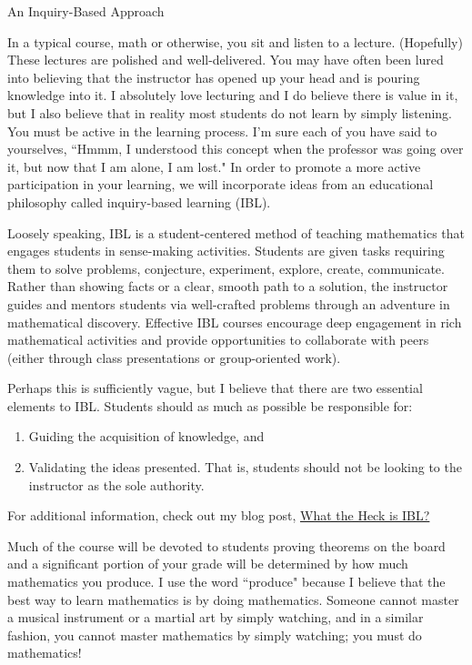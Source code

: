 \begin{section}{An Inquiry-Based Approach}

In a typical course, math or otherwise, you sit and listen to a lecture. (Hopefully) These lectures are polished and well-delivered. You may have often been lured into believing that the instructor has opened up your head and is pouring knowledge into it. I absolutely love lecturing and I do believe there is value in it, but I also believe that in reality most students do not learn by simply listening. You must be active in the learning process. I'm sure each of you have said to yourselves, ``Hmmm, I understood this concept when the professor was going over it, but now that I am alone, I am lost." In order to promote a more active participation in your learning, we will incorporate ideas from an educational philosophy called inquiry-based learning (IBL).

Loosely speaking, IBL is a student-centered method of teaching mathematics that engages students in sense-making activities.  Students are given tasks requiring them to solve problems, conjecture, experiment, explore, create, communicate.  Rather than showing facts or a clear, smooth path to a solution, the instructor guides and mentors students via well-crafted problems through an adventure in mathematical discovery.  Effective IBL courses encourage deep engagement in rich mathematical activities and provide opportunities to collaborate with peers (either through class presentations or group-oriented work).

Perhaps this is sufficiently vague, but I believe that there are two essential elements to IBL.  Students should as much as possible be responsible for:
\begin{enumerate}
\item Guiding the acquisition of knowledge, and
\item Validating the ideas presented.  That is, students should not be looking to the instructor as the sole authority.
\end{enumerate}
\noindent For additional information, check out my blog post, \href{http://maamathedmatters.blogspot.com/2013/05/what-heck-is-ibl.html}{What the Heck is IBL?}

Much of the course will be devoted to students proving theorems on the board and a significant portion of your grade will be determined by how much mathematics you produce. I use the word ``produce" because I believe that the best way to learn mathematics is by doing mathematics. Someone cannot master a musical instrument or a martial art by simply watching, and in a similar fashion, you cannot master mathematics by simply watching; you must do mathematics!


\end{section}
